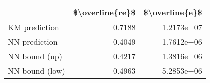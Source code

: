 \begin{tabular}{lrr}
\toprule
{} &  \$\textbackslash overline\{re\}\$ &  \$\textbackslash overline\{e\}\$ \\
\midrule
KM prediction  &           0.7188 &      1.2173e+07 \\
NN prediction  &           0.4049 &      1.7612e+06 \\
NN bound (up)  &           0.4217 &      1.3816e+06 \\
NN bound (low) &           0.4963 &      5.2853e+06 \\
\bottomrule
\end{tabular}
